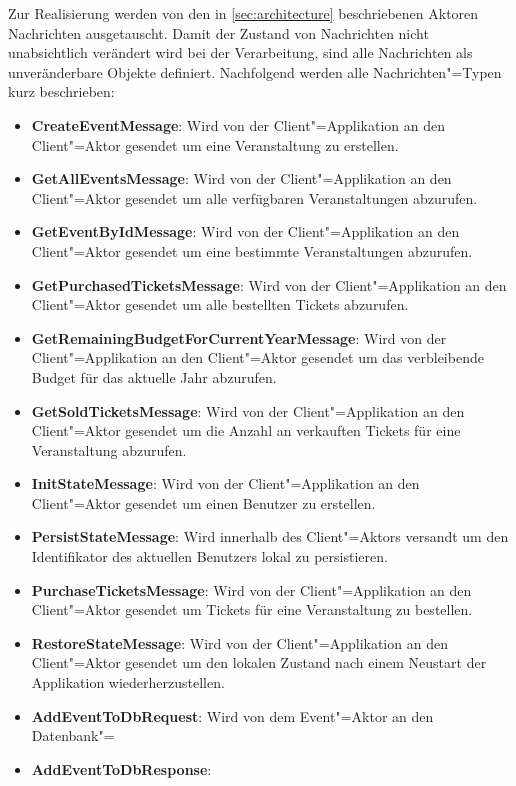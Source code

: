 Zur Realisierung werden von den in \autoref{sec:architecture} beschriebenen Aktoren Nachrichten ausgetauscht.
Damit der Zustand von Nachrichten nicht unabsichtlich verändert wird bei der Verarbeitung, sind alle Nachrichten als unveränderbare Objekte definiert.
Nachfolgend werden alle Nachrichten"=Typen kurz beschrieben:

\begin{itemize}[itemsep=-.5em,leftmargin=*]
    \item \textbf{CreateEventMessage}: Wird von der Client"=Applikation an den Client"=Aktor gesendet um eine Veranstaltung zu erstellen.
    \item \textbf{GetAllEventsMessage}: Wird von der Client"=Applikation an den Client"=Aktor gesendet um alle verfügbaren Veranstaltungen abzurufen.
    \item \textbf{GetEventByIdMessage}: Wird von der Client"=Applikation an den Client"=Aktor gesendet um eine bestimmte Veranstaltungen abzurufen.
    \item \textbf{GetPurchasedTicketsMessage}: Wird von der Client"=Applikation an den Client"=Aktor gesendet um alle bestellten Tickets abzurufen.
    \item \textbf{GetRemainingBudgetForCurrentYearMessage}: Wird von der Client"=Applikation an den Client"=Aktor gesendet um das verbleibende Budget für das aktuelle Jahr abzurufen.
    \item \textbf{GetSoldTicketsMessage}: Wird von der Client"=Applikation an den Client"=Aktor gesendet um die Anzahl an verkauften Tickets für eine Veranstaltung abzurufen.
    \item \textbf{InitStateMessage}: Wird von der Client"=Applikation an den Client"=Aktor gesendet um einen Benutzer zu erstellen.
    \item \textbf{PersistStateMessage}: Wird innerhalb des Client"=Aktors versandt um den Identifikator des aktuellen Benutzers lokal zu persistieren.
    \item \textbf{PurchaseTicketsMessage}: Wird von der Client"=Applikation an den Client"=Aktor gesendet um Tickets für eine Veranstaltung zu bestellen.
    \item \textbf{RestoreStateMessage}: Wird von der Client"=Applikation an den Client"=Aktor gesendet um den lokalen Zustand nach einem Neustart der Applikation wiederherzustellen.
    \item \textbf{AddEventToDbRequest}: Wird von dem Event"=Aktor an den Datenbank"=
    \item \textbf{AddEventToDbResponse}:

\end{itemize}
